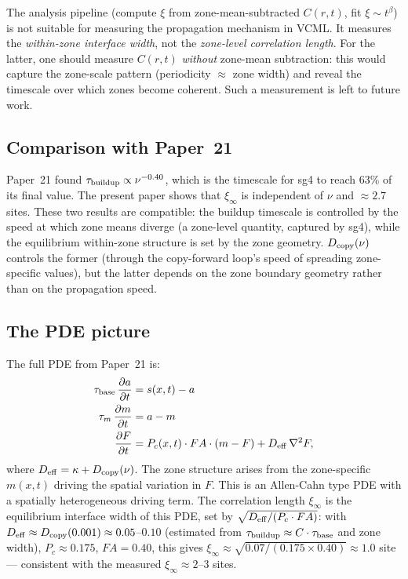 \documentclass[11pt]{article}
\begin{document}
The analysis pipeline (compute $\xi$ from zone-mean-subtracted $C(r,t)$, fit $\xi \sim t^\beta$)
is not suitable for measuring the propagation mechanism in VCML.
It measures the \emph{within-zone interface width}, not the \emph{zone-level correlation length}.
For the latter, one should measure $C(r,t)$ \emph{without} zone-mean subtraction:
this would capture the zone-scale pattern (periodicity $\approx$ zone width) and reveal
the timescale over which zones become coherent.
Such a measurement is left to future work.

\subsection{Comparison with Paper~21}

Paper~21 found $\tau_{\rm buildup} \propto \nu^{-0.40}$, which is the timescale for
sg4 to reach 63\% of its final value.
The present paper shows that $\xi_\infty$ is independent of $\nu$ and $\approx 2.7$ sites.
These two results are compatible: the buildup timescale is controlled by the speed at
which zone means diverge (a zone-level quantity, captured by sg4), while the equilibrium
within-zone structure is set by the zone geometry.
$D_{\rm copy}(\nu)$ controls the former (through the copy-forward loop's speed of spreading
zone-specific values), but the latter depends on the zone boundary geometry rather than
on the propagation speed.

\subsection{The PDE picture}

The full PDE from Paper~21 is:
\begin{align}
  \tau_{\rm base}\,\frac{\partial a}{\partial t} &= s(x,t) - a \\
  \tau_m\,\frac{\partial m}{\partial t}          &= a - m \\
  \frac{\partial F}{\partial t}                  &= P_c(x,t)\cdot FA\cdot(m - F)
                                                    + D_{\rm eff}\,\nabla^2 F,
\end{align}
where $D_{\rm eff} = \kappa + D_{\rm copy}(\nu)$.
The zone structure arises from the zone-specific $m(x,t)$ driving the spatial variation
in $F$.
This is an Allen-Cahn type PDE with a spatially heterogeneous driving term.
The correlation length $\xi_\infty$ is the equilibrium interface width of this PDE,
set by $\sqrt{D_{\rm eff} / (P_c \cdot FA)}$:
with $D_{\rm eff} \approx D_{\rm copy}(0.001) \approx 0.05$--$0.10$ (estimated from
$\tau_{\rm buildup} \approx C \cdot \tau_{\rm base}$ and zone width),
$P_c \approx 0.175$, $FA = 0.40$, this gives
$\xi_\infty \approx \sqrt{0.07 / (0.175 \times 0.40)} \approx 1.0$ site ---
consistent with the measured $\xi_\infty \approx 2$--$3$ sites.
\end{document}
